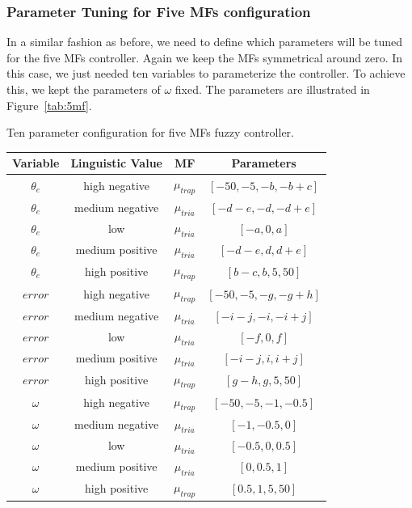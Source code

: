 \documentclass[symmetry,article,submit,moreauthors,pdftex]{Definitions/mdpi}
\begin{document}
\subsubsection{ Parameter Tuning for Five MFs configuration}

In a similar fashion as before, we need to define which parameters will be
tuned for the five MFs controller. Again we keep the MFs symmetrical around
zero. In this case, we just needed ten variables to parameterize the
controller. To achieve this, we kept the parameters of $\omega$ fixed. The
parameters are illustrated in Figure~\ref{tab:5mf}.

\begin{specialtable}[htbp]
    \small
    \caption{Ten parameter configuration for five MFs fuzzy controller.}\label{tab:5mf}
    \begin{tabular}{cccc}
    \toprule
     \textbf{Variable} & \textbf{Linguistic Value} & \textbf{MF}& \textbf{Parameters}  \\
    \midrule
    $\theta_e$ & high negative  & $\mu_{trap}$  & $[-50, -5, -b, -b+c]$     \\ 
    $\theta_e$ & medium negative& $\mu_{tria}$  & $[-d-e, -d, -d+e]$     \\ 
    $\theta_e$ & low            & $\mu_{tria}$  & $[-a, 0, a]$     \\ 
    $\theta_e$ & medium positive& $\mu_{tria}$  & $[-d-e, d, d+e]$     \\ 
    $\theta_e$ & high positive  & $\mu_{trap}$  & $[b-c, b, 5, 50]$ \\

    \midrule
    $error$ & high negative  & $\mu_{trap}$  & $[-50, -5, -g, -g+h]$     \\ 
    $error$ & medium negative& $\mu_{tria}$  & $[-i-j, -i, -i+j]$     \\ 
    $error$ & low            & $\mu_{tria}$  & $[-f, 0, f]$     \\ 
    $error$ & medium positive& $\mu_{tria}$  & $[-i-j, i, i+j]$     \\ 
    $error$ & high positive  & $\mu_{trap}$  & $[g-h, g, 5, 50]$ \\

    \midrule
    $\omega$ & high negative  & $\mu_{trap}$  & $[-50, -5, -1, -0.5]$     \\ 
    $\omega$ & medium negative& $\mu_{tria}$  & $[-1, -0.5, 0]$     \\ 
    $\omega$ & low            & $\mu_{tria}$  & $[-0.5, 0, 0.5]$     \\ 
    $\omega$ & medium positive& $\mu_{tria}$  & $[0, 0.5,1]$     \\ 
    $\omega$ & high positive  & $\mu_{trap}$  & $[0.5, 1 ,5, 50]$     \\ 
    \bottomrule
\end{tabular}
\end{specialtable}
\end{document}

